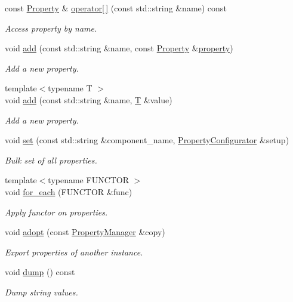 \begin{DoxyCompactItemize}
const \hyperlink{class_d_d4hep_1_1_property}{Property} \& \hyperlink{class_d_d4hep_1_1_property_manager_a125377ba1788d787d807f102dee9980e}{operator\mbox{[}$\,$\mbox{]}} (const std\+::string \&name) const
\begin{DoxyCompactList}\small\item\em Access property by name. \end{DoxyCompactList}\item 
void \hyperlink{class_d_d4hep_1_1_property_manager_a22dd94fc144031932799c3e4fe431503}{add} (const std\+::string \&name, const \hyperlink{class_d_d4hep_1_1_property}{Property} \&\hyperlink{class_d_d4hep_1_1_property_manager_af0214bbdd3a5ffb94dcdbc9528295990}{property})
\begin{DoxyCompactList}\small\item\em Add a new property. \end{DoxyCompactList}\item 
{\footnotesize template$<$typename T $>$ }\\void \hyperlink{class_d_d4hep_1_1_property_manager_adca1582e1f5e71fcd8782d0503897289}{add} (const std\+::string \&name, \hyperlink{class_t}{T} \&value)
\begin{DoxyCompactList}\small\item\em Add a new property. \end{DoxyCompactList}\item 
void \hyperlink{class_d_d4hep_1_1_property_manager_aa1a25710c88d1c14bbe2c565f0a6957c}{set} (const std\+::string \&component\+\_\+name, \hyperlink{class_d_d4hep_1_1_property_configurator}{Property\+Configurator} \&setup)
\begin{DoxyCompactList}\small\item\em Bulk set of all properties. \end{DoxyCompactList}\item 
{\footnotesize template$<$typename F\+U\+N\+C\+T\+OR $>$ }\\void \hyperlink{class_d_d4hep_1_1_property_manager_ab13bf51cccabd287b45efc2f8b7584d2}{for\+\_\+each} (F\+U\+N\+C\+T\+OR \&func)
\begin{DoxyCompactList}\small\item\em Apply functor on properties. \end{DoxyCompactList}\item 
void \hyperlink{class_d_d4hep_1_1_property_manager_aaf21d1b86b833d99d004a77db1872141}{adopt} (const \hyperlink{class_d_d4hep_1_1_property_manager}{Property\+Manager} \&copy)
\begin{DoxyCompactList}\small\item\em Export properties of another instance. \end{DoxyCompactList}\item 
void \hyperlink{class_d_d4hep_1_1_property_manager_a0b1a0a2e6541ec8e191aa05194f5eac5}{dump} () const
\begin{DoxyCompactList}\small\item\em Dump string values. \end{DoxyCompactList}\end{DoxyCompactItemize}

